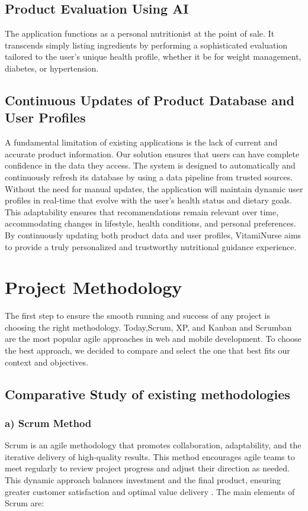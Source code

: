 \subsection{Product Evaluation Using AI}

The application functions as a personal nutritionist at the point of sale.
It transcends simply listing ingredients by performing a sophisticated
evaluation tailored to the user’s unique health profile, whether it be for
weight management, diabetes, or hypertension.


\subsection{Continuous Updates of Product Database and User Profiles}

A fundamental limitation of existing applications is the lack of current
and accurate product information. Our solution ensures that users can
have complete confidence in the data they access. The system is designed
to automatically and continuously refresh its database by using a data
pipeline from trusted sources.
Without the need for manual updates, the application will maintain
dynamic user profiles in real-time that evolve with the user’s health
status and dietary goals. This adaptability ensures that recommendations
remain relevant over time, accommodating changes in lifestyle, health
conditions, and personal preferences. By continuously updating both
product data and user profiles, VitamiNurse aims to provide a truly
personalized and trustworthy nutritional guidance experience.


\section{Project Methodology}

The first step to ensure the smooth running and success of any project
is choosing the right methodology. Today,Scrum, XP, and Kanban and
Scrumban are the most popular agile approaches in web and mobile
development. To choose the best approach, we decided to compare and
select the one that best fits our context and objectives.

\subsection{Comparative Study of existing methodologies}
\subsubsection{a) Scrum Method} 
Scrum is an agile methodology that promotes collaboration, adaptability, and the iterative delivery of high-quality results. This method encourages agile teams to meet regularly to review project progress and adjust their direction as needed. This dynamic approach balances investment and the final product, ensuring greater customer satisfaction and optimal value delivery \cite{scrum2025}.
The main elements of Scrum are:

